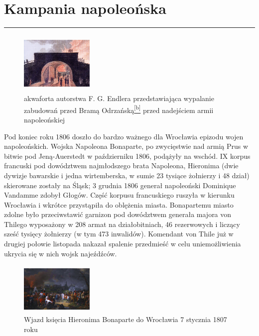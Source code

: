 \documentclass{article}
\begin{document}
\section{Kampania napoleońska}
\noindent\rule{\textwidth}{0.4pt}

\needspace{3.0cm}
\begin{figure}
    \includegraphics[width = 3.5cm, height = 3.0cm]{images/Zdjecie06.jpg}
    \caption{akwaforta autorstwa F. G. Endlera przedstawiająca wypalanie zabudowań przed Bramą Odrzańską\protect\hyperlink{b}{\textsuperscript{[b]}} przed nadejściem armii napoleońskiej}
\end{figure}

Pod koniec roku 1806 doszło do bardzo ważnego dla Wrocławia epizodu wojen napoleońskich. Wojska Napoleona Bonaparte, po zwycięstwie nad armią Prus w bitwie pod Jeną-Auerstedt w październiku 1806, podążyły na wschód. IX korpus francuski pod dowództwem najmłodszego brata Napoleona, Hieronima (dwie dywizje bawarskie i jedna wirtemberska, w sumie 23 tysiące żołnierzy i 48 dział) skierowane zostały na Śląsk; 3 grudnia 1806 generał napoleoński Dominique Vandamme zdobył Głogów. Część korpusu francuskiego ruszyła w kierunku Wrocławia i wkrótce przystąpiła do oblężenia miasta. Bonapartemu miasto zdolne było przeciwstawić garnizon pod dowództwem generała majora von Thilego wyposażony w 208 armat na działobitniach, 46 rezerwowych i liczący sześć tysięcy żołnierzy (w tym 473 inwalidów). Komendant von Thile już w drugiej połowie listopada nakazał spalenie przedmieść w celu uniemożliwienia ukrycia się w nich wojsk najeźdźców.

\begin{figure}
    \includegraphics[width = 3.5cm, height = 2.5cm]{images/Zdjecie07.PNG}
    \caption{Wjazd księcia Hieronima Bonaparte do Wrocławia 7 stycznia 1807 roku}
\end{figure}
\end{document}
